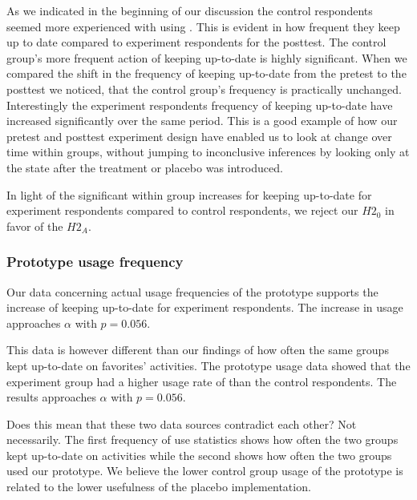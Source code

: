 As we indicated in the beginning of our discussion the control respondents
seemed more experienced with using \urort{}. This is evident in how
frequent they keep up to date compared to experiment respondents for the
posttest.%
The control group's more frequent action of keeping up-to-date is highly
significant. When we compared the shift in the frequency of keeping up-to-date
from the pretest to the posttest%
we noticed, that the control group's frequency is practically unchanged.
Interestingly the experiment respondents frequency of keeping up-to-date have
increased significantly over the same period. This is a good example
of how our pretest and posttest experiment design have enabled us to look
at change over time within groups, without jumping to inconclusive inferences
by looking only at the state after the treatment or placebo was introduced.

In light of the significant within group increases for keeping up-to-date
for experiment respondents compared to control respondents,
we reject our $H2_0$ in favor of the $H2_A$.

\subsubsection{Prototype usage frequency}

Our data concerning actual usage frequencies of the prototype%
supports the
increase of keeping up-to-date for experiment respondents. The increase in
usage approaches $\alpha$ with $p = 0.056$.

This data is however
different than our findings of how often the same groups kept up-to-date
on favorites' activities. The prototype usage data showed that the experiment
group had a higher usage rate of \latest{} than the control respondents. The
results approaches $\alpha$ with $p = 0.056$.

Does this mean that these two data sources contradict each other? Not
necessarily. The first frequency of use statistics shows how often the two
groups kept up-to-date on activities while the second shows how often
the two groups used our prototype. We believe the lower control group usage of
the prototype is related to the lower usefulness of the placebo
implementation.

